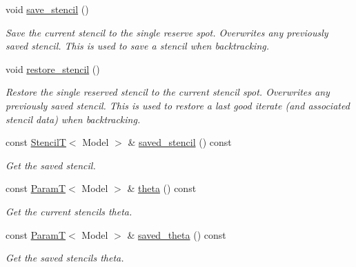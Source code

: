 \begin{DoxyCompactItemize}
\item 
void \hyperlink{classmappel_1_1estimator_1_1IterativeMaximizer_1_1MaximizerData_a73c1093de92f8acf15ac1439ef0a87fa}{save\+\_\+stencil} ()
\begin{DoxyCompactList}\small\item\em Save the current stencil to the single reserve spot. Overwrites any previously saved stencil. This is used to save a stencil when backtracking. \end{DoxyCompactList}\item 
void \hyperlink{classmappel_1_1estimator_1_1IterativeMaximizer_1_1MaximizerData_a45134c67de7ff0ebc7e1598455c10936}{restore\+\_\+stencil} ()
\begin{DoxyCompactList}\small\item\em Restore the single reserved stencil to the current stencil spot. Overwrites any previously saved stencil. This is used to restore a last good iterate (and associated stencil data) when backtracking. \end{DoxyCompactList}\item 
const \hyperlink{namespacemappel_a3a06598240007876f8c4bf834ad86197}{StencilT}$<$ Model $>$ \& \hyperlink{classmappel_1_1estimator_1_1IterativeMaximizer_1_1MaximizerData_a7826552acc941c57e35a34ff6e76342f}{saved\+\_\+stencil} () const 
\begin{DoxyCompactList}\small\item\em Get the saved stencil. \end{DoxyCompactList}\item 
const \hyperlink{namespacemappel_a667925cb0d6c0e49f2f035cc5a9a6857}{ParamT}$<$ Model $>$ \& \hyperlink{classmappel_1_1estimator_1_1IterativeMaximizer_1_1MaximizerData_a8403d38e51ad4c203e7fd0bb649cac12}{theta} () const 
\begin{DoxyCompactList}\small\item\em Get the current stencil\textquotesingle{}s theta. \end{DoxyCompactList}\item 
const \hyperlink{namespacemappel_a667925cb0d6c0e49f2f035cc5a9a6857}{ParamT}$<$ Model $>$ \& \hyperlink{classmappel_1_1estimator_1_1IterativeMaximizer_1_1MaximizerData_af67b817bb600391ee92ece8b38e6afa6}{saved\+\_\+theta} () const 
\begin{DoxyCompactList}\small\item\em Get the saved stencil\textquotesingle{}s theta. \end{DoxyCompactList}\item 

\end{DoxyCompactItemize}
